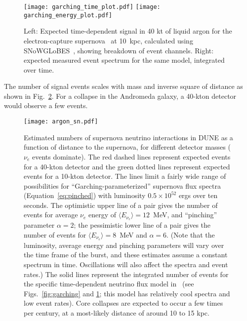 \begin{figure}[!htb]
\centering
\texttt{[image: garching\_time\_plot.pdf]}
\texttt{[image: garching\_energy\_plot.pdf]}
\vspace{-5pt}
\caption[Supernova $\nu$ event rates in \SI{40}{kt} of LAr for Garching flux]{Left: Expected
  time-dependent signal in 40 kt of liquid argon for the electron-capture supernova~\cite{Huedepohl:2009wh} at 10~kpc, calculated using SNoWGLoBES~\cite{snowglobes}, showing breakdown of event channels.  Right: expected measured event spectrum for the same model, integrated over time.}

  \label{fig:eventrates}
\end{figure}

The number of signal events scales with mass and inverse square of distance as shown in Fig.~\ref{fig:ratesvsdist}.  For a collapse in the Andromeda galaxy, a 40-kton detector would observe a few events.

\begin{figure}[!htb]
\centering
\texttt{[image: argon\_sn.pdf]}
\caption[Rates vs distance]{Estimated numbers of supernova neutrino interactions in DUNE as a function of distance to the supernova, for different detector masses ($\nu_e$ events dominate). The red dashed lines represent expected events for a 40-kton detector and the green dotted lines represent expected events for a 10-kton detector. The lines limit a fairly wide range of possibilities for ``Garching-parameterized'' supernova flux spectra (Equation~\ref{eq:pinched}) with luminosity $0.5\times 10^{52}$ ergs over ten seconds. The optimistic upper line of a pair gives the number of events for average $\nu_e$ energy of $\langle E_{\nu_e}\rangle =12$~MeV, and ``pinching'' parameter $\alpha=2$; the pessimistic lower line of a pair gives the number of events for $\langle E_{\nu_e}\rangle=8$~MeV and $\alpha=6$. (Note that the luminosity, average energy and pinching parameters will vary over the time frame of the burst, and these estimates assume a constant spectrum in time. Oscillations will also affect the spectra and event rates.) The solid lines represent the integrated number of events for the specific time-dependent neutrino flux model in~\cite{Huedepohl:2009wh} (see Figs.~\ref{fig:garching} and \ref{fig:eventrates}; this model has relatively cool spectra and low event rates). Core collapses are expected to occur a few times per century, at a most-likely distance of around 10 to 15 kpc.}

  \label{fig:ratesvsdist}
\end{figure}



